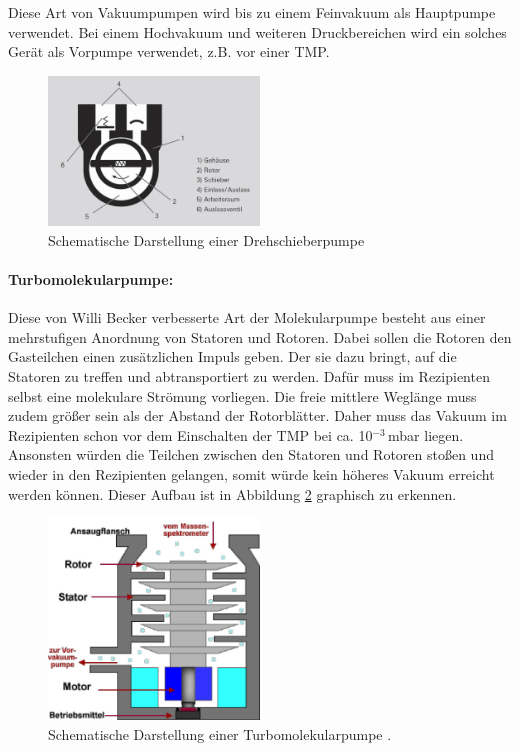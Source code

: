  Diese Art von Vakuumpumpen wird bis zu einem Feinvakuum als Hauptpumpe verwendet. Bei einem Hochvakuum und weiteren Druckbereichen wird
 ein solches Gerät als Vorpumpe verwendet, z.B. vor einer TMP.

 \begin{figure}
   \centering
   \includegraphics[width=0.5\textwidth]{Drehschieberpumpe.png}
   \caption{Schematische Darstellung einer Drehschieberpumpe \cite{DSP}}
   \label{fig:DSP}
 \end{figure}

 \paragraph{Turbomolekularpumpe:}
 Diese von Willi Becker verbesserte Art der Molekularpumpe besteht aus einer mehrstufigen Anordnung von Statoren und Rotoren. Dabei sollen die
 Rotoren den Gasteilchen einen zusätzlichen Impuls geben. Der sie dazu bringt, auf die Statoren zu treffen und abtransportiert zu werden. Dafür
 muss im Rezipienten selbst eine molekulare Strömung vorliegen. Die freie mittlere Weglänge muss zudem größer sein als der Abstand der Rotorblätter.
 Daher muss das Vakuum im Rezipienten schon vor dem Einschalten der TMP bei ca. 10$^{-3}\,$mbar liegen. Ansonsten würden die Teilchen zwischen
 den Statoren und Rotoren stoßen und wieder in den Rezipienten gelangen, somit würde kein höheres Vakuum erreicht werden können.
 Dieser Aufbau ist in Abbildung \ref{fig:TMP} graphisch zu erkennen.
\begin{figure}
  \centering
  \includegraphics[width=0.5\textwidth]{TMP.JPG}
  \caption{Schematische Darstellung einer Turbomolekularpumpe \cite{TMP}.}
  \label{fig:TMP}
\end{figure}
\FloatBarrier

